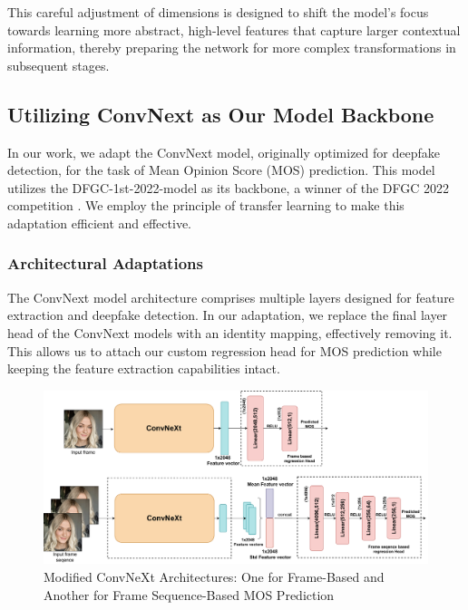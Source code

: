 \documentclass[a4paper,12pt,openright]{book}
\begin{document}
\begin{itemize}
This careful adjustment of dimensions is designed to shift the model's focus towards learning more abstract, high-level features that capture larger contextual information, thereby preparing the network for more complex transformations in subsequent stages.

\end{itemize}

\subsection{Utilizing ConvNext as Our Model Backbone}

In our work, we adapt the ConvNext model, originally optimized for deepfake detection, for the task of Mean Opinion Score (MOS) prediction. This model utilizes the DFGC-1st-2022-model as its backbone, a winner of the DFGC 2022 competition \cite{peng2022dfgc}. We employ the principle of transfer learning to make this adaptation efficient and effective.

\subsubsection{Architectural Adaptations}

The ConvNext model architecture comprises multiple layers designed for feature extraction and deepfake detection. In our adaptation, we replace the final layer head of the ConvNext models with an identity mapping, effectively removing it. This allows us to attach our custom regression head for MOS prediction while keeping the feature extraction capabilities intact.

\begin{figure}[h]
\centering
\includegraphics[width=1.1\textwidth]{images/convmy.drawio.pdf}
\caption{Modified ConvNeXt Architectures: One for Frame-Based and Another for Frame Sequence-Based MOS Prediction}\label{fig:modified_convnext}
\end{figure}
\end{document}
